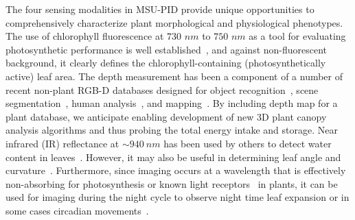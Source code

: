 
The four sensing modalities in MSU-PID provide unique opportunities to comprehensively characterize plant morphological and physiological phenotypes.
The use of chlorophyll fluorescence at $730$ $nm$ to $750$ $nm$ as a tool for evaluating photosynthetic performance is well established~\cite{baker2008chlorophyll}, and against non-fluorescent background, it clearly defines the chlorophyll-containing (photosynthetically active) leaf area.
The depth measurement has been a component of a number of recent non-plant RGB-D databases designed for object recognition~\cite{Lai2011}, scene segmentation~\cite{Silberman2011}, human analysis~\cite{Sung2011,Barbosa:reid12}, and mapping~\cite{sturm12iros}.
By including depth map for a plant database, we anticipate enabling development of new $3$D plant canopy analysis algorithms and thus probing the total energy intake and storage.
Near infrared (IR) reflectance at $\sim940~nm$ has been used by others to detect water content in leaves~\cite{chen2014dissecting}.
However, it may also be useful in determining leaf angle and curvature~\cite{woolley1971reflectance}.
Furthermore, since imaging occurs at a wavelength that is effectively non-absorbing for photosynthesis or known light receptors~\cite{butler1964actton,eskins1992light} in plants, it can be used for imaging during the night cycle to observe night time leaf expansion or in some cases circadian movements~\cite{mcclung2006plant}.







